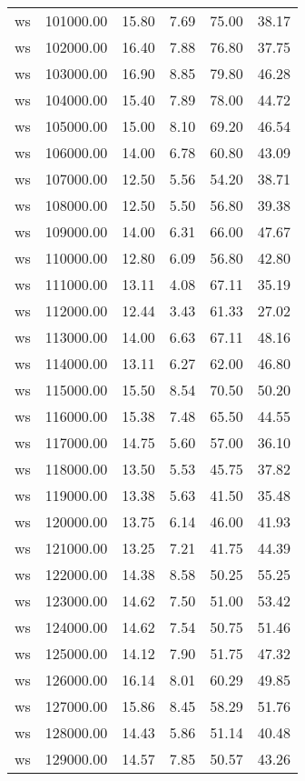 \begin{table}[ht]
\begin{table}[ht]
\begin{tabular}{|cccccc}
  ws & 101000.00 & 15.80 & 7.69 & 75.00 & 38.17 \\ 
  ws & 102000.00 & 16.40 & 7.88 & 76.80 & 37.75 \\ 
  ws & 103000.00 & 16.90 & 8.85 & 79.80 & 46.28 \\ 
  ws & 104000.00 & 15.40 & 7.89 & 78.00 & 44.72 \\ 
  ws & 105000.00 & 15.00 & 8.10 & 69.20 & 46.54 \\ 
  ws & 106000.00 & 14.00 & 6.78 & 60.80 & 43.09 \\ 
  ws & 107000.00 & 12.50 & 5.56 & 54.20 & 38.71 \\ 
  ws & 108000.00 & 12.50 & 5.50 & 56.80 & 39.38 \\ 
  ws & 109000.00 & 14.00 & 6.31 & 66.00 & 47.67 \\ 
  ws & 110000.00 & 12.80 & 6.09 & 56.80 & 42.80 \\ 
  ws & 111000.00 & 13.11 & 4.08 & 67.11 & 35.19 \\ 
  ws & 112000.00 & 12.44 & 3.43 & 61.33 & 27.02 \\ 
  ws & 113000.00 & 14.00 & 6.63 & 67.11 & 48.16 \\ 
  ws & 114000.00 & 13.11 & 6.27 & 62.00 & 46.80 \\ 
  ws & 115000.00 & 15.50 & 8.54 & 70.50 & 50.20 \\ 
  ws & 116000.00 & 15.38 & 7.48 & 65.50 & 44.55 \\ 
  ws & 117000.00 & 14.75 & 5.60 & 57.00 & 36.10 \\ 
  ws & 118000.00 & 13.50 & 5.53 & 45.75 & 37.82 \\ 
  ws & 119000.00 & 13.38 & 5.63 & 41.50 & 35.48 \\ 
  ws & 120000.00 & 13.75 & 6.14 & 46.00 & 41.93 \\ 
  ws & 121000.00 & 13.25 & 7.21 & 41.75 & 44.39 \\ 
  ws & 122000.00 & 14.38 & 8.58 & 50.25 & 55.25 \\ 
  ws & 123000.00 & 14.62 & 7.50 & 51.00 & 53.42 \\ 
  ws & 124000.00 & 14.62 & 7.54 & 50.75 & 51.46 \\ 
  ws & 125000.00 & 14.12 & 7.90 & 51.75 & 47.32 \\ 
  ws & 126000.00 & 16.14 & 8.01 & 60.29 & 49.85 \\ 
  ws & 127000.00 & 15.86 & 8.45 & 58.29 & 51.76 \\ 
  ws & 128000.00 & 14.43 & 5.86 & 51.14 & 40.48 \\ 
  ws & 129000.00 & 14.57 & 7.85 & 50.57 & 43.26 \\ 

\end{tabular}
\end{table}
\end{table}
